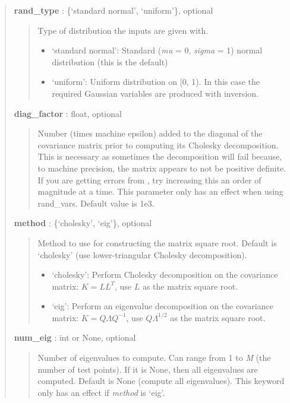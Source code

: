 \documentclass[letterpaper,10pt,english]{sphinxmanual}
\begin{document}
\begin{fulllineitems}
\begin{fulllineitems}
\begin{quote}
\begin{description}
\textbf{rand\_type} : \{`standard normal', `uniform'\}, optional
\begin{quote}

Type of distribution the inputs are given with.
\begin{itemize}
\item {} 
`standard normal': Standard (\emph{mu} = 0, \emph{sigma} = 1) normal
distribution (this is the default)

\item {} 
`uniform': Uniform distribution on {[}0, 1). In this case
the required Gaussian variables are produced with inversion.

\end{itemize}
\end{quote}

\textbf{diag\_factor} : float, optional
\begin{quote}

Number (times machine epsilon) added to the diagonal of the
covariance matrix prior to computing its Cholesky decomposition.
This is necessary as sometimes the decomposition will fail because,
to machine precision, the matrix appears to not be positive definite.
If you are getting errors from , try
increasing this an order of magnitude at a time. This parameter only
has an effect when using rand\_vars. Default value is 1e3.
\end{quote}

\textbf{method} : \{`cholesky', `eig'\}, optional
\begin{quote}

Method to use for constructing the matrix square root. Default is
`cholesky' (use lower-triangular Cholesky decomposition).
\begin{itemize}
\item {} 
`cholesky': Perform Cholesky decomposition on the covariance
matrix: \(K=LL^T\), use \(L\) as the matrix square
root.

\item {} 
`eig': Perform an eigenvalue decomposition on the covariance
matrix: \(K=Q \Lambda Q^{-1}\), use \(Q\Lambda^{1/2}\)
as the matrix square root.

\end{itemize}
\end{quote}

\textbf{num\_eig} : int or None, optional
\begin{quote}

Number of eigenvalues to compute. Can range from 1 to \emph{M} (the
number of test points). If it is None, then all eigenvalues are
computed. Default is None (compute all eigenvalues). This keyword
only has an effect if \emph{method} is `eig'.
\end{quote}


\end{description}
\end{quote}
\end{fulllineitems}
\end{fulllineitems}
\end{document}
